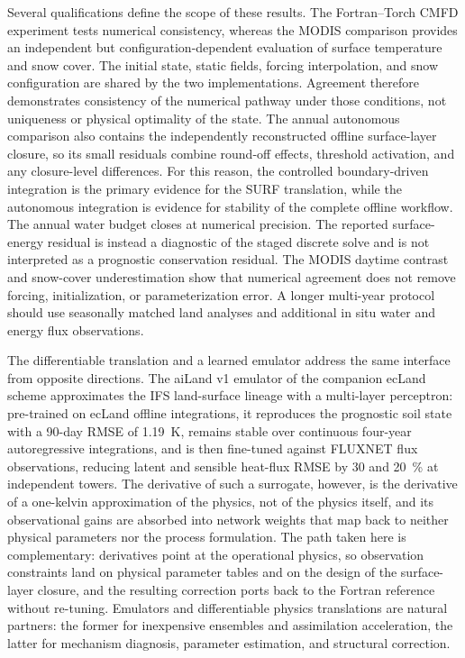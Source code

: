\documentclass[gmd, manuscript]{copernicus}
\begin{document}
Several qualifications define the scope of these results. The Fortran--Torch
CMFD experiment tests numerical consistency, whereas the MODIS comparison
provides an independent but configuration-dependent evaluation of surface
temperature and snow cover. The initial state,
static fields, forcing interpolation, and snow configuration are shared by
the two implementations. Agreement therefore demonstrates consistency of the
numerical pathway under those conditions, not uniqueness or physical
optimality of the state. The annual autonomous comparison also
contains the independently reconstructed offline surface-layer closure, so its
small residuals combine round-off effects, threshold activation, and any
closure-level differences. For this reason, the controlled boundary-driven integration is the
primary evidence for the SURF translation, while the autonomous integration
is
evidence for stability of the complete offline workflow. The annual water
budget closes at numerical precision. The reported surface-energy residual is
instead a diagnostic of the staged discrete solve and is not interpreted as a
prognostic conservation residual. The MODIS daytime contrast and snow-cover
underestimation show that numerical agreement does not remove forcing,
initialization, or parameterization error. A longer multi-year protocol should
use seasonally matched land analyses and additional in situ water and energy
flux observations.

The differentiable translation and a learned emulator address the same
interface from opposite directions. The aiLand v1 emulator of the companion
ecLand scheme \citep{Raoult2026aiLand} approximates the IFS land-surface
lineage with a multi-layer perceptron: pre-trained on ecLand offline
integrations, it reproduces the prognostic soil state with a 90-day RMSE of
1.19~K, remains stable over continuous four-year autoregressive
integrations, and is then fine-tuned against FLUXNET flux observations,
reducing latent and sensible heat-flux RMSE by 30 and 20~\% at independent
towers. The derivative of such a surrogate, however, is the derivative of a
one-kelvin approximation of the physics, not of the physics itself, and its
observational gains are absorbed into network weights that map back to
neither physical parameters nor the process formulation. The path taken
here is complementary: derivatives point at the operational physics, so
observation constraints land on physical parameter tables and on the design
of the surface-layer closure, and the resulting correction ports back to
the Fortran reference without re-tuning. Emulators and differentiable
physics translations are natural partners: the former for inexpensive
ensembles and assimilation acceleration, the latter for mechanism
diagnosis, parameter estimation, and structural correction.
\end{document}
